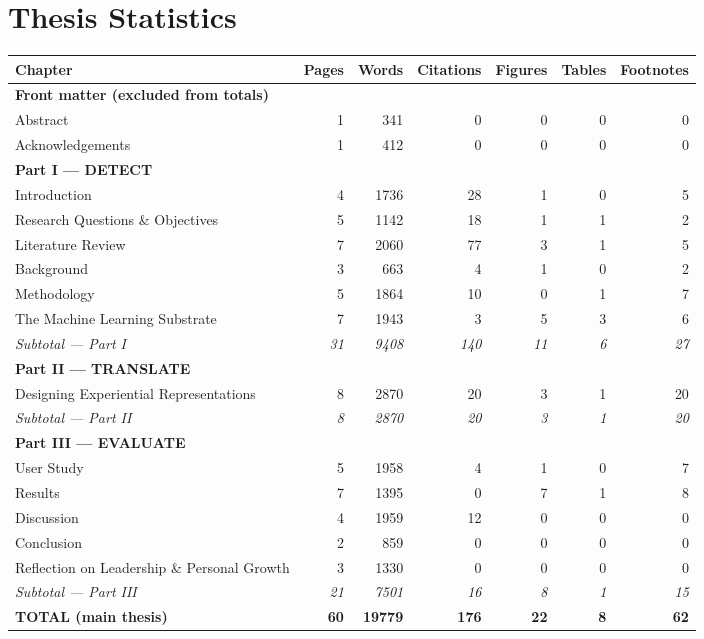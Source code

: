 \documentclass[11pt,a4paper]{article}
\begin{document}
\section*{Thesis Statistics}

\begin{tabularx}{\textwidth}{Xrrrrrr}
\toprule
Chapter & Pages & Words & Citations & Figures & Tables & Footnotes \\
\midrule
\multicolumn{7}{l}{\textbf{Front matter (excluded from totals)}} \\
\midrule
Abstract & 1 & 341 & 0 & 0 & 0 & 0 \\
Acknowledgements & 1 & 412 & 0 & 0 & 0 & 0 \\
\midrule
\multicolumn{7}{l}{\textbf{Part I --- DETECT}} \\
\midrule
Introduction & 4 & 1736 & 28 & 1 & 0 & 5 \\
Research Questions \& Objectives & 5 & 1142 & 18 & 1 & 1 & 2 \\
Literature Review & 7 & 2060 & 77 & 3 & 1 & 5 \\
Background & 3 & 663 & 4 & 1 & 0 & 2 \\
Methodology & 5 & 1864 & 10 & 0 & 1 & 7 \\
The Machine Learning Substrate & 7 & 1943 & 3 & 5 & 3 & 6 \\
\midrule
\textit{Subtotal --- Part I} & \textit{31} & \textit{9408} & \textit{140} & \textit{11} & \textit{6} & \textit{27} \\
\midrule
\multicolumn{7}{l}{\textbf{Part II --- TRANSLATE}} \\
\midrule
Designing Experiential Representations & 8 & 2870 & 20 & 3 & 1 & 20 \\
\midrule
\textit{Subtotal --- Part II} & \textit{8} & \textit{2870} & \textit{20} & \textit{3} & \textit{1} & \textit{20} \\
\midrule
\multicolumn{7}{l}{\textbf{Part III --- EVALUATE}} \\
\midrule
User Study & 5 & 1958 & 4 & 1 & 0 & 7 \\
Results & 7 & 1395 & 0 & 7 & 1 & 8 \\
Discussion & 4 & 1959 & 12 & 0 & 0 & 0 \\
Conclusion & 2 & 859 & 0 & 0 & 0 & 0 \\
Reflection on Leadership \& Personal Growth & 3 & 1330 & 0 & 0 & 0 & 0 \\
\midrule
\textit{Subtotal --- Part III} & \textit{21} & \textit{7501} & \textit{16} & \textit{8} & \textit{1} & \textit{15} \\
\midrule
\textbf{TOTAL (main thesis)} & \textbf{60} & \textbf{19779} & \textbf{176} & \textbf{22} & \textbf{8} & \textbf{62} \\
\bottomrule
\end{tabularx}
\end{document}
